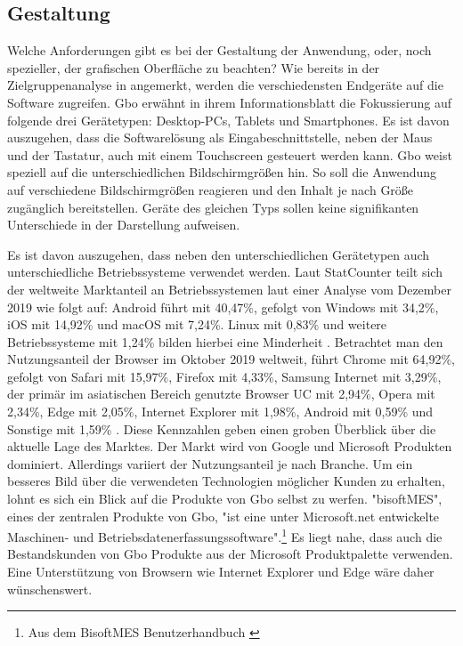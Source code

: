 \subsection{Gestaltung}
\label{subsec:gestaltung}
Welche Anforderungen gibt es bei der Gestaltung der Anwendung, oder, noch spezieller, 
der grafischen Oberfläche zu beachten? Wie bereits in der Zielgruppenanalyse in 
angemerkt, werden die verschiedensten Endgeräte auf die Software zugreifen.
Gbo erwähnt in ihrem Informationsblatt die Fokussierung auf folgende
drei Gerätetypen: Desktop-PCs, Tablets und Smartphones. Es ist davon auszugehen, dass die
Softwarelösung als Eingabeschnittstelle, neben der Maus und der Tastatur, auch mit einem Touchscreen
gesteuert werden kann. Gbo weist speziell auf die unterschiedlichen Bildschirmgrößen
hin. So soll die Anwendung auf verschiedene Bildschirmgrößen reagieren und den Inhalt je nach
Größe zugänglich bereitstellen. Geräte des gleichen Typs sollen keine signifikanten Unterschiede
in der Darstellung aufweisen.

Es ist davon auszugehen, dass neben den unterschiedlichen Gerätetypen auch unterschiedliche
Betriebssysteme verwendet werden. Laut StatCounter teilt sich der weltweite Marktanteil
an Betriebssystemen laut einer Analyse vom Dezember 2019 wie folgt auf: Android führt mit
40,47\%, gefolgt von Windows mit 34,2\%, iOS mit 14,92\% und macOS mit 7,24\%. Linux mit 0,83\% und weitere
Betriebssysteme mit 1,24\% bilden hierbei eine Minderheit \cite{StatCounterOSMarketShare}. Betrachtet man den
Nutzungsanteil der Browser im Oktober 2019 weltweit, führt Chrome mit 64,92\%, gefolgt von Safari mit 15,97\%,
Firefox mit 4,33\%, Samsung Internet mit 3,29\%, der primär im asiatischen Bereich genutzte Browser UC
mit 2,94\%, Opera mit 2,34\%, Edge mit 2,05\%, Internet Explorer mit 1,98\%, Android mit 0,59\% und Sonstige mit 1,59\% \cite{StatCounterBrowserMarketShare}.
Diese Kennzahlen geben einen groben Überblick über die aktuelle Lage des Marktes. Der Markt wird von
Google und Microsoft Produkten dominiert. Allerdings variiert der Nutzungsanteil je nach Branche.
Um ein besseres Bild über die verwendeten Technologien möglicher Kunden zu erhalten,
lohnt es sich ein Blick auf die Produkte von Gbo selbst zu werfen.
"bisoftMES", eines der zentralen Produkte von Gbo, "ist eine unter Microsoft.net
entwickelte Maschinen- und Betriebsdatenerfassungssoftware".\footnote{Aus dem BisoftMES Benutzerhandbuch \cite[S. 7]{BisoftMESHandbuch}}
Es liegt nahe, dass auch die Bestandskunden von Gbo Produkte aus der Microsoft
Produktpalette verwenden. Eine Unterstützung von Browsern wie Internet Explorer und Edge
wäre daher wünschenswert.

